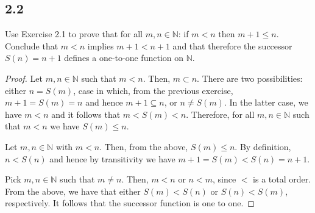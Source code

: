 \subsection*{2.2} Use Exercise 2.1 to prove that for all $m,n\in \mathbb{N}$: if $m < n$ then $m+1 \leq n$. Conclude that $m < n$ implies $m+1 < n+1$ and that therefore the successor $S(n)=n+1$ defines a one-to-one function on $\mathbb{N}$.

\begin{proof}
Let $m,n \in \mathbb{N}$ such that $m < n$. Then, $m \subset n$. There are two possibilities: either $n = S(m)$, case in which, from the previous exercise, $m+1 = S(m) = n$ and hence $m+1 \subseteq n$, or $n \neq S(m)$. In the latter case, we have $m < n$ and it follows that $m < S(m) < n$. Therefore, for all $m,n \in \mathbb{N}$ such that $m < n$ we have $S(m) \leq n$.

\vspace{1em}

Let $m,n \in \mathbb{N}$ with $m < n$. Then, from the above, $S(m) \leq n$. By definition, $n < S(n)$ and hence by transitivity we have $m+1 = S(m) < S(n) = n+1$.

\vspace{1em}

Pick $m,n \in \mathbb{N}$ such that $m \neq n$. Then, $m < n$ or $n < m$, since $<$ is a total order. From the above, we have that either $S(m) < S(n)$ or $S(n) < S(m)$, respectively. It follows that the successor function is one to one.

\end{proof}

